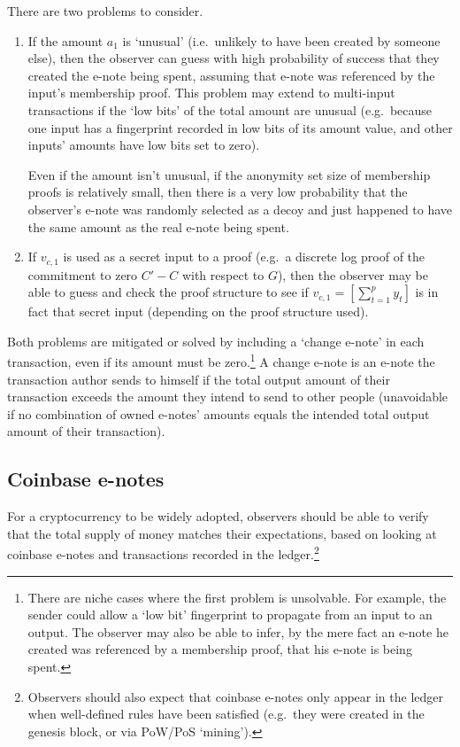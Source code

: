 There are two problems to consider.
\begin{enumerate}
    \item If the amount $a_1$ is `unusual' (i.e.\ unlikely to have been created by someone else), then the observer can guess with high probability of success that they created the e-note being spent, assuming that e-note was referenced by the input's membership proof. This problem may extend to multi-input transactions if the `low bits' of the total amount are unusual (e.g.\ because one input has a fingerprint recorded in low bits of its amount value, and other inputs' amounts have low bits set to zero).

    Even if the amount isn't unusual, if the anonymity set size of membership proofs is relatively small, then there is a very low probability that the observer's e-note was randomly selected as a decoy and just happened to have the same amount as the real e-note being spent.

    \item If $v_{c,1}$ is used as a secret input to a proof (e.g.\ a discrete log proof of the commitment to zero $C' - C$ with respect to $G$), then the observer may be able to guess and check the proof structure to see if $v_{c,1} = [\sum^{p}_{t=1} y_t]$ is in fact that secret input (depending on the proof structure used).
\end{enumerate}

Both problems are mitigated or solved by including a `change e-note' in each transaction, even if its amount must be zero.\footnote{There are niche cases where the first problem is unsolvable. For example, the sender could allow a `low bit' fingerprint to propagate from an input to an output. The observer may also be able to infer, by the mere fact an e-note he created was referenced by a membership proof, that his e-note is being spent.} A change e-note is an e-note the transaction author sends to himself if the total output amount of their transaction exceeds the amount they intend to send to other people (unavoidable if no combination of owned e-notes' amounts equals the intended total output amount of their transaction).


\subsection{Coinbase e-notes}
\label{subsec:implementers-coinbase-enotes}

For a cryptocurrency to be widely adopted, observers should be able to verify that the total supply of money matches their expectations, based on looking at coinbase e-notes and transactions recorded in the ledger.\footnote{Observers should also expect that coinbase e-notes only appear in the ledger when well-defined rules have been satisfied (e.g.\ they were created in the genesis block, or via PoW/PoS `mining').}

